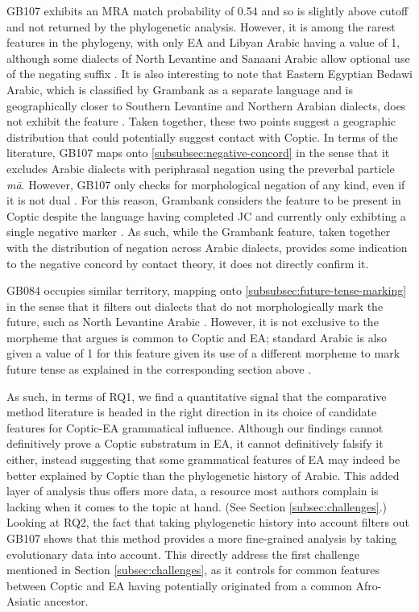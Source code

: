 \documentclass[12pt,a4paper]{article}
\begin{document}
GB107 exhibits an MRA match probability of 0.54 and so is slightly above cutoff and not returned by the phylogenetic analysis. However, it is among the rarest features in the phylogeny, with only EA and Libyan Arabic having a value of 1, although some dialects of North Levantine and Sanaani Arabic allow optional use of the negating suffix \parencite{skirgard_grambank_2023}. It is also interesting to note that Eastern Egyptian Bedawi Arabic, which is classified by Grambank as a separate language and is geographically closer to Southern Levantine and Northern Arabian dialects, does not exhibit the feature \parencite{skirgard_grambank_2023}. Taken together, these two points suggest a geographic distribution that could potentially suggest contact with Coptic. In terms of the literature, GB107 maps onto \ref{subsubsec:negative-concord}  in the sense that it excludes Arabic dialects with periphrasal negation using the preverbal particle \textit{mā}. However, GB107 only checks for morphological negation of any kind, even if it is not dual \parencite{skirgard_grambank_2023}. For this reason, Grambank considers the feature to be present in Coptic despite the language having completed JC and currently only exhibting a single negative marker \parencite{lucas_contact_2010}. As such, while the Grambank feature, taken together with the distribution of negation across Arabic dialects, provides some indication to the negative concord by contact theory, it does not directly confirm it.

GB084 occupies similar territory, mapping onto \ref{subsubsec:future-tense-marking}  in the sense that it filters out dialects that do not morphologically mark the future, such as North Levantine Arabic \parencite{skirgard_grambank_2023}. However, it is not exclusive to the morpheme that \textcite{abdelrahman_linguistic_2023} argues is common to Coptic and EA; standard Arabic is also given a value of 1 for this feature given its use of a different morpheme to mark future tense as explained in the corresponding section above \parencite{skirgard_grambank_2023, abdelrahman_linguistic_2023}.

As such, in terms of RQ1, we find a quantitative signal that the comparative method literature is headed in the right direction in its choice of candidate features for Coptic-EA grammatical influence. Although our findings cannot definitively prove a Coptic substratum in EA, it cannot definitively falsify it either, instead suggesting that some grammatical features of EA may indeed be better explained by Coptic than the phylogenetic history of Arabic. This added layer of analysis thus offers more data, a resource most authors complain is lacking when it comes to the topic at hand. (See Section \ref{subsec:challenges}.) Looking at RQ2, the fact that taking phylogenetic history into account filters out GB107 shows that this method provides a more fine-grained analysis by taking evolutionary data into account. This directly address the first challenge mentioned in Section \ref{subsec:challenges}, as it controls for common features between Coptic and EA having potentially originated from a common Afro-Asiatic ancestor.
\end{document}
